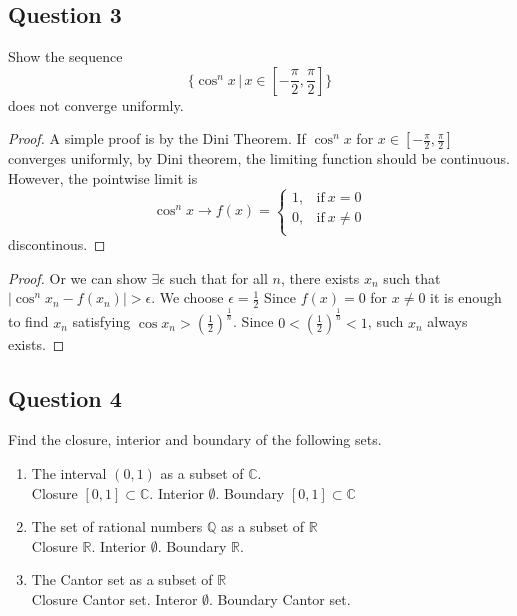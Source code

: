 \documentclass{tufte-book}
\theoremstyle{mytheoremstyle}
\theoremstyle{mylemstyle}
\theoremstyle{mydefstyle}
\begin{document}
\subsection{Question 3}
Show the sequence
\[ \{ \cos^nx \,|\, x \in [-\frac{\pi}{2}, \frac{\pi}{2}] \} \]
does not converge uniformly.

\begin{proof}
A simple proof is by the Dini Theorem.  If $\cos^nx$ for $x \in [-\frac{\pi}{2}, \frac{\pi}{2}]$ converges uniformly, by Dini theorem, the limiting function should be continuous.  However, the pointwise limit is
\[ \cos^nx \to f(x) = \begin{cases}
      1, & \text{if}\ x = 0\\
      0, & \text{if}\ x \neq 0\\
\end{cases} 
\]
discontinous.
\end{proof}

\begin{proof}
Or we can show $\exists \epsilon$ such that for all $n$, there exists $x_n$ such that $|\cos^nx_n - f(x_n)| > \epsilon$.  We choose $\epsilon = \frac{1}{2}$  Since $f(x) = 0$ for $x \neq 0$ it is enough to find $x_n$ satisfying $\cos x_n > (\frac{1}{2})^\frac{1}{n}$.  Since $0 < (\frac{1}{2})^\frac{1}{n} < 1$, such $x_n$ always exists.

\end{proof}

\subsection{Question 4}
Find the closure, interior and boundary of the following sets.
\begin{enumerate}
\item The interval $(0,1)$ as a subset of $\mathbb{C}$.\\
Closure $[0,1] \subset \mathbb{C}$.  Interior $\emptyset$.  Boundary $[0,1] \subset \mathbb{C}$

\item The set of rational numbers $\mathbb{Q}$ as a subset of $\mathbb{R}$\\
Closure $\mathbb{R}$. Interior $\emptyset$. Boundary $\mathbb{R}$.

\item The Cantor set as a subset of $\mathbb{R}$\\
Closure Cantor set.  Interor $\emptyset$.  Boundary Cantor set.
\end{enumerate}
\end{document}
